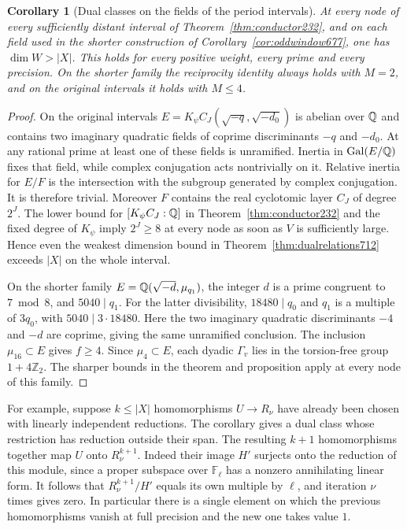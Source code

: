 \documentclass[a4paper,11pt]{article}
\newtheorem{corollary}[proposition]{Corollary}
\theoremstyle{definition}
\theoremstyle{remark}
\newcommand{\ZZ}{\mathbb Z}\newcommand{\ord}{\operatorname{ord}}
\numberwithin{equation}{section}
\begin{document}
\begin{corollary}[Dual classes on the fields of the period intervals]
\leavevmode\label{cor:fieldrelations712}
At every node of every sufficiently distant interval of
Theorem~\ref{thm:conductor232}, and on each field used in the
shorter construction of Corollary~\ref{cor:oddwindow677},
one has \(\dim W>|X|\). This holds for every positive weight,
every prime and every precision. On the shorter family the
reciprocity identity always holds with \(M=2\), and on the
original intervals it holds with \(M\le4\).
\end{corollary}
\begin{proof}
On the original intervals
\(E=K_\psi C_J(\sqrt{-q},\sqrt{-d_0})\) is abelian over
\(\mathbb Q\) and contains two imaginary quadratic fields of
coprime discriminants \(-q\) and \(-d_0\). At any rational prime
at least one of these fields is unramified. Inertia in
\(\operatorname{Gal}(E/\mathbb Q)\) fixes that field, while complex conjugation
acts nontrivially on it. Relative inertia for \(E/F\) is the
intersection with the subgroup generated by complex conjugation.
It is therefore trivial. Moreover \(F\) contains the real
cyclotomic layer \(C_J\) of degree \(2^J\). The lower bound
for \([K_\psi C_J:\mathbb Q]\) in Theorem~\ref{thm:conductor232} and
the fixed degree of \(K_\psi\) imply \(2^J\ge8\) at every node
as soon as \(V\) is sufficiently large. Hence even the weakest
dimension bound in Theorem~\ref{thm:dualrelations712} exceeds
\(|X|\) on the whole interval.

On the shorter family \(E=\mathbb Q(\sqrt{-d},\mu_{q_1})\), the
integer \(d\) is a prime congruent to \(7\bmod 8\), and
\(5040\mid q_1\). For the latter divisibility, \(18480\mid q_0\)
and \(q_1\) is a multiple of \(3q_0\), with \(5040\mid3\cdot18480\).
Here the two imaginary quadratic discriminants \(-4\) and
\(-d\) are coprime, giving the same unramified conclusion.
The inclusion \(\mu_{16}\subset E\) gives \(f\ge4\). Since
\(\mu_4\subset E\), each dyadic \(\Gamma_v\) lies in the
torsion-free group \(1+4\ZZ_2\). The sharper bounds in the
theorem and proposition apply at every node of this family.
\end{proof}

For example, suppose \(k\le |X|\) homomorphisms
\(U\to R_\nu\) have already been chosen with linearly
independent reductions. The corollary gives a dual class whose
restriction has reduction outside their span. The resulting
\(k+1\) homomorphisms together map \(U\) onto \(R_\nu^{k+1}\).
Indeed their image \(H'\) surjects onto the reduction of this
module, since a proper subspace over \(\mathbb F_\ell\) has
a nonzero annihilating linear form. It follows that
\(R_\nu^{k+1}/H'\) equals its own multiple by \(\ell\), and
iteration \(\nu\) times gives zero. In particular there is a
single element on which the previous homomorphisms vanish at
full precision and the new one takes value \(1\).
\end{document}
